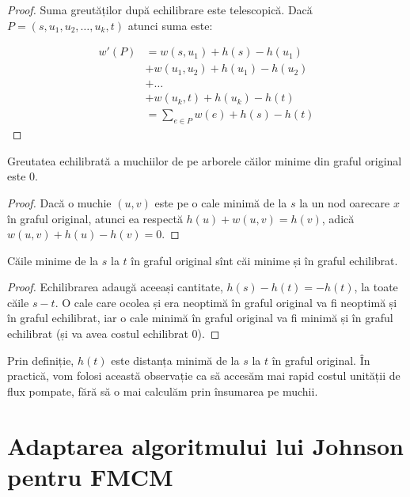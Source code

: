 \documentclass[../main.tex]{subfiles}
\begin{document}
\begin{proof}
  Suma greutăților după echilibrare este telescopică. Dacă $P = (s, u_1, u_2, \dots, u_k, t)$ atunci suma este:

  \begin{align*}
    w'(P) &= w(s, u_1) + h(s) - h(u_1)\\
          &+ w(u_1, u_2) + h(u_1) - h(u_2)\\
          &+ \dots\\
          &+ w(u_k, t) + h(u_k) - h(t)\\
          &= \sum_{e \in P} w(e) + h(s) - h(t)
  \end{align*}
\end{proof}

\begin{remark}
  Greutatea echilibrată a muchiilor de pe arborele căilor minime din graful original este 0.
\end{remark}

\begin{proof}
  Dacă o muchie $(u, v)$ este pe o cale minimă de la $s$ la un nod oarecare $x$ în graful original, atunci ea respectă $h(u) + w(u, v) = h(v)$, adică $w(u,v) + h(u) - h(v) = 0$.
\end{proof}

\begin{remark}
  Căile minime de la $s$ la $t$ în graful original sînt căi minime și în graful echilibrat.
\end{remark}

\begin{proof}
  Echilibrarea adaugă aceeași cantitate, $h(s) - h(t) = -h(t)$, la toate căile $s-t$. O cale care ocolea și era neoptimă în graful original va fi neoptimă și în graful echilibrat, iar o cale minimă în graful original va fi minimă și în graful echilibrat (și va avea costul echilibrat 0).
\end{proof}

\begin{remark}
  Prin definiție, $h(t)$ este distanța minimă de la $s$ la $t$ în graful original. În practică, vom folosi această observație ca să accesăm mai rapid costul unității de flux pompate, fără să o mai calculăm prin însumarea pe muchii.
\end{remark}


\section{Adaptarea algoritmului lui Johnson pentru FMCM}
\end{document}
